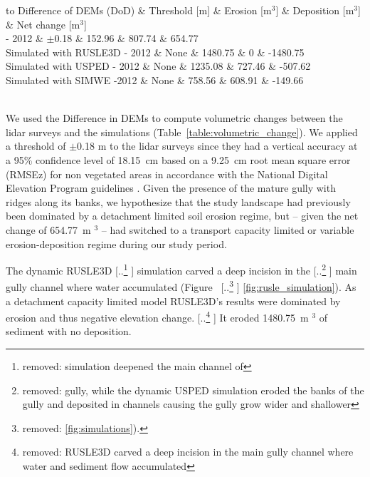 \documentclass[gmd, manuscript]{copernicus}
\providecommand{\DIFadd}[1]{{\protect\color{blue} \sf #1}} %
\providecommand{\DIFdel}[1]{{\protect\color{red} [..\footnote{removed: #1} ]}} %
\providecommand{\DIFaddbegin}{} %
\providecommand{\DIFaddend}{} %
\providecommand{\DIFdelbegin}{} %
\providecommand{\DIFdelend}{} %
\begin{document}
\DIFaddbegin 
\DIFadd{
\begin{table}
\small
\caption{Volumetric change}
\begin{tabu} to \textwidth {lXXXl}
\toprule
Difference of DEMs (DoD) & Threshold [m] &  Erosion [m$^3$] & Deposition [m$^3$] & Net change [m$^3$]\\
\midrule
2016 - 2012 & $\pm$0.18 & 152.96 & 807.74 & 654.77\\
Simulated with RUSLE3D - 2012 & None & 1480.75 & 0 & -1480.75\\
Simulated with USPED - 2012 & None & 1235.08 & 727.46 & -507.62\\
Simulated with SIMWE -2012 & None & 758.56 & 608.91 & -149.66\\
\bottomrule
\\
\end{tabu}
\label{table:volumetric_change} 
\end{table}
}
\DIFaddend



\DIFadd{We used the Difference in DEMs
to compute volumetric changes
between the lidar surveys
and the simulations
(Table~\ref{table:volumetric_change}).
We applied a threshold of $\pm$0.18 }\unit{m}
\DIFadd{to the lidar surveys since they had a
vertical accuracy at a 95\% confidence level
of 18.15~}\unit{cm} 
\DIFadd{based on a 9.25~}\unit{cm} \DIFadd{root mean square error (RMSEz) 
for non vegetated areas in accordance with 
the National Digital Elevation Program guidelines
\citep{NCLidar2018}.
Given the presence of the mature gully 
with ridges along its banks, 
we hypothesize that
the study landscape had previously been dominated by 
a detachment limited soil erosion regime, 
but -- given the net change of 654.77~}\unit{m}\DIFadd{$^3$ --
had switched to a transport capacity limited or 
variable erosion-deposition regime
during our study period. 
}

\DIFaddend The dynamic RUSLE3D \DIFdelbegin \DIFdel{simulation
deepened the main channel of }\DIFdelend \DIFaddbegin \DIFadd{simulation 
carved a deep incision 
in }\DIFaddend the \DIFdelbegin \DIFdel{gully,
while the dynamic USPED simulation
eroded the banks of the gully
and deposited in channels
causing the gully grow wider and shallower
}\DIFdelend \DIFaddbegin \DIFadd{main gully channel
where water accumulated
}\DIFaddend (Figure~\DIFdelbegin \DIFdel{\ref{fig:simulations}).
}\DIFdelend \DIFaddbegin \DIFadd{\ref{fig:rusle_simulation}).
}\DIFaddend As a detachment capacity limited model
RUSLE3D's results were
dominated by erosion and 
thus negative elevation change.
\DIFdelbegin \DIFdel{RUSLE3D carved a deep incision 
in the main gully channel
where water and sediment flow accumulated
}\DIFdelend \DIFaddbegin \DIFadd{It eroded 1480.75~}\unit{m}\DIFadd{$^3$ of sediment
with no deposition.
}
\end{document}
